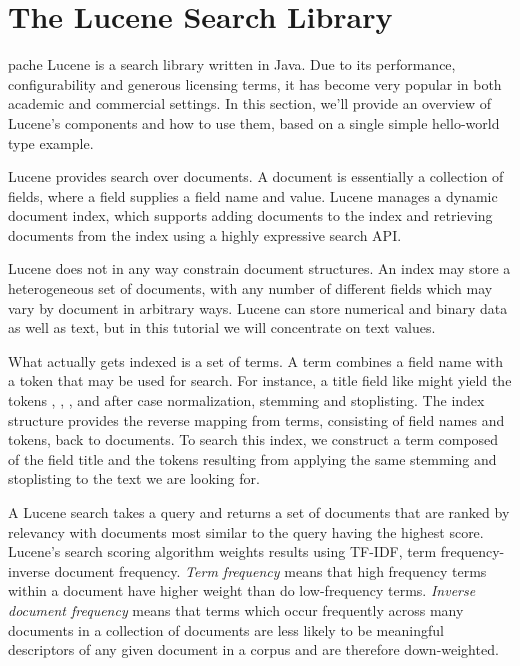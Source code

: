 \chapter{The Lucene Search Library}\label{chap:lucene}

pache Lucene is a search library written in Java.  Due to
its performance, configurability and generous licensing terms, it has
become very popular in both academic and commercial settings.  In this
section, we'll provide an overview of Lucene's components and how to
use them, based on a single simple hello-world type example.  

Lucene provides search over documents.  A document is essentially a
collection of fields, where a field supplies a field name and value.
Lucene manages a dynamic document index, which supports adding
documents to the index and retrieving documents from the index using a
highly expressive search API.  

Lucene does not in any way constrain document structures.  An index
may store a heterogeneous set of documents, with any number of
different fields which may vary by document in arbitrary ways. 
Lucene can store numerical and binary data as well as text, 
but in this tutorial we will concentrate on text values.

What actually gets indexed is a set of terms.  A term combines a field
name with a token that may be used for search.  For instance, a title
field like  might yield
the tokens , ,
, and  after case
normalization, stemming and stoplisting.  The index structure provides
the reverse mapping from terms, consisting of field names and tokens,
back to documents.  To search this index, we construct a term composed
of the field title and the tokens resulting from applying the same
stemming and stoplisting to the text we are looking for.

A Lucene search takes a query and returns a set of documents that are
ranked by relevancy with documents most similar to the query having
the highest score.  Lucene's search scoring algorithm weights results using
{TF-IDF}, term frequency-inverse document frequency.
\emph{Term frequency} means that high frequency terms within
a document have higher weight than do low-frequency terms.
\emph{Inverse document frequency} means that terms which occur
frequently across many documents in a collection of documents are less
likely to be meaningful descriptors of any given document in a corpus
and are therefore down-weighted.


